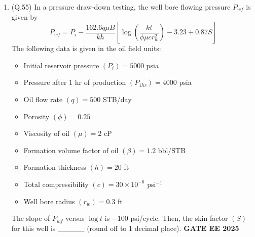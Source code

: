 \documentclass{article}
\begin{document}
\begin{enumerate}[leftmargin=*,label=\textbf{Q.\arabic*},start=1]
    \item (Q.55) In a pressure draw-down testing, the well bore flowing pressure $P_{wf}$ is given by
    \[ P_{wf} = P_i - \frac{162.6 q \mu B}{kh} \left[ \log \left( \frac{k t}{\phi \mu c r_w^2} \right) - 3.23 + 0.87 S \right] \]
    The following data is given in the oil field units:
    \begin{itemize}
        \item Initial reservoir pressure $(P_i) = 5000$ psia
        \item Pressure after 1 hr of production $(P_{1hr}) = 4000$ psia
        \item Oil flow rate $(q) = 500$ STB/day
        \item Porosity $(\phi) = 0.25$
        \item Viscosity of oil $(\mu) = 2$ cP
        \item Formation volume factor of oil $(\beta) = 1.2$ bbl/STB
        \item Formation thickness $(h) = 20$ ft
        \item Total compressibility $(c) = 30 \times 10^{-6}$ psi$^{-1}$
        \item Well bore radius $(r_w) = 0.3$ ft
    \end{itemize}
    The slope of $P_{wf}$ versus $\log t$ is $-100$ psi/cycle. Then, the skin factor $(S)$ for this well is \_\_\_\_\_ (round off to 1 decimal place).
    \textbf{GATE EE 2025}
\end{enumerate}
\end{document}

